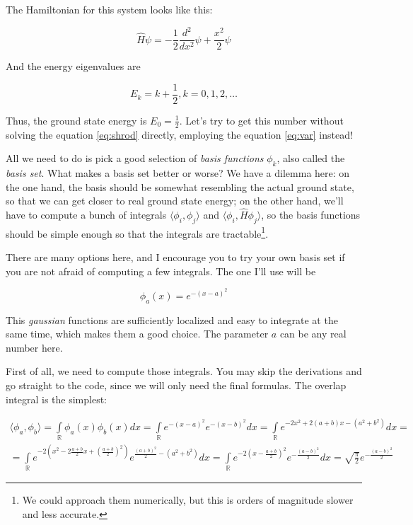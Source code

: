 \documentclass{article}
\begin{document}
The Hamiltonian for this system looks like this:

\begin{equation} \label{eq:harmonic-hamiltonian} \hat H \psi = -\frac{1}{2} \frac{d^2}{dx^2} \psi + \frac{x^2}{2} \psi \end{equation}

And the energy eigenvalues are\cite{ref:atkins}

\begin{equation} E_k = k + \frac{1}{2}, k = 0,1,2,\dots \end{equation}

Thus, the ground state energy is \(E_0=\frac{1}{2}\). Let's try to get this number without solving the equation \eqref{eq:shrod} directly, employing the equation \eqref{eq:var} instead!

All we need to do is pick a good selection of \textit{basis functions} \(\phi_k\), also called the \textit{basis set}. What makes a basis set better or worse? We have a dilemma here: on the one hand, the basis should be somewhat resembling the actual ground state, so that we can get closer to real ground state energy; on the other hand, we'll have to compute a bunch of integrals \(\langle \phi_i, \phi_j\rangle\) and \(\langle \phi_i, \hat H \phi_j\rangle\), so the basis functions should be simple enough so that the integrals are tractable\footnote{We could approach them numerically, but this is orders of magnitude slower and less accurate.}.

There are many options here, and I encourage you to try your own basis set if you are not afraid of computing a few integrals. The one I'll use will be

\begin{equation} \phi_a(x) = e^{-(x-a)^2} \end{equation}

This \textit{gaussian} functions are sufficiently localized and easy to integrate at the same time, which makes them a good choice. The parameter \(a\) can be any real number here.

First of all, we need to compute those integrals. You may skip the derivations and go straight to the code, since we will only need the final formulas. The overlap integral is the simplest:

\begin{equation} \label{eq:exp-overlap}
\begin{gathered}
\langle \phi_a, \phi_b \rangle = \int\limits_\mathbb{R} \phi_a(x) \phi_b(x) dx = \int\limits_\mathbb{R} e^{-(x-a)^2} e^{-(x-b)^2} dx = \int\limits_\mathbb{R} e^{-2x^2+2(a+b)x-\left(a^2+b^2\right)} dx =
\\
= \int\limits_\mathbb{R} e^{-2\left(x^2-2\frac{a+b}{2}x + \left(\frac{a+b}{2}\right)^2\right)} e^{\frac{(a+b)^2}{2} - \left(a^2+b^2\right)} dx = \int\limits_\mathbb{R} e^{-2\left(x-\frac{a+b}{2}\right)^2} e^{-\frac{(a-b)^2}{2}} dx = \sqrt{\frac{\pi}{2}} e^{-\frac{(a-b)^2}{2}}
\end{gathered}
\end{equation}
\end{document}

